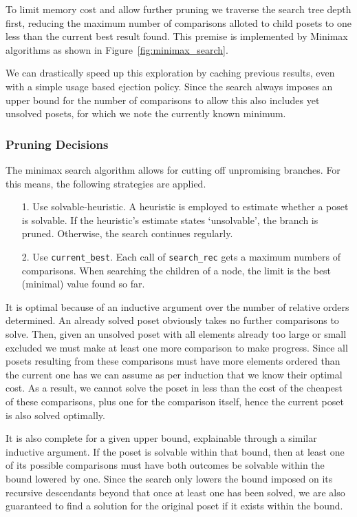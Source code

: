 \documentclass[10pt,journal,compsoc]{IEEEtran}
\begin{document}
To limit memory cost and allow further pruning we traverse the search tree depth first, reducing the maximum number of comparisons alloted to child posets to one less than the current best result found.
This premise is implemented by Minimax algorithms as shown in Figure~\ref{fig:minimax_search}.

We can drastically speed up this exploration by caching previous results, even with a simple usage based ejection policy. Since the search always imposes an upper bound for the number of comparisons to allow this also includes yet unsolved posets, for which we note the currently known minimum.

\subsubsection{Pruning Decisions}
The minimax search algorithm allows for cutting off unpromising branches.
For this means, the following strategies are applied.

\begin{enumerate}
  \item[1.]
        Use solvable-heuristic. A heuristic is employed to estimate whether a poset is solvable. If the heuristic's estimate states `unsolvable', the branch is pruned.
        Otherwise, the search continues regularly.
  \item[2.]
        Use \texttt{current\_best}. Each call of \texttt{search\_rec} gets a maximum numbers of comparisons.
        When searching the children of a node, the limit is the best (minimal) value found so far.
\end{enumerate}

It is optimal because of an inductive argument over the number of relative orders determined.
An already solved poset obviously takes no further comparisons to solve.
Then, given an unsolved poset with all elements already too large or small excluded we must make at least one more comparison to
make progress.
Since all posets resulting from these comparisons must have more elements ordered than the current one has we can assume as per induction that we know their optimal cost.
As a result, we cannot solve the poset in less than the cost of the cheapest of these comparisons, plus one for the comparison itself, hence the current poset is also solved optimally.

It is also complete for a given upper bound, explainable through a similar inductive argument.
If the poset is solvable within that bound, then at least one of its possible comparisons must have both outcomes be solvable within the bound lowered by one.
Since the search only lowers the bound imposed on its recursive descendants beyond that once at least one has been solved, we are also guaranteed to find a solution for the original poset if it exists within the bound.
\end{document}
